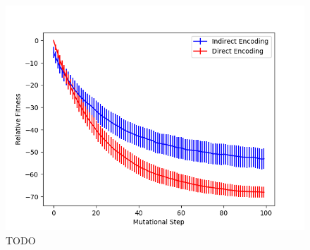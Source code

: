 \begin{figure}
  \includegraphics[width=\linewidth]{img/scrabble_rel_fit_vs_step}
  \caption{TODO}
  \label{fig:scrabble_rel_fit_vs_step}
\end{figure}
